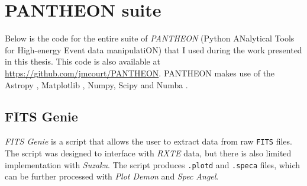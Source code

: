 \chapter{PANTHEON suite}

\label{app:PAN}

\par Below is the code for the entire suite of \textit{PANTHEON} (Python ANalytical Tools for High-energy Event data manipulatiON) that I used during the work presented in this thesis.  This code is also available at \url{https://github.com/jmcourt/PANTHEON}.  PANTHEON makes use of the Astropy \citep{Astropy}, Matplotlib \citep{Hunter_MatPlotLib}, Numpy, Scipy \citep{NumPy} and Numba \citep{Numba}.

\section{FITS Genie}

\par \textit{FITS Genie} is a script that allows the user to extract data from raw \texttt{FITS} files.  The script was designed to interface with \textit{RXTE} data, but there is also limited implementation with \textit{Suzaku}.  The script produces \texttt{.plotd} and \texttt{.speca} files, which can be further processed with \textit{Plot Demon} and \textit{Spec Angel}.

